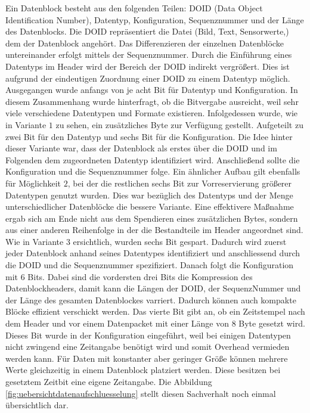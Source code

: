 Ein Datenblock besteht aus den folgenden Teilen: \gls{DOID} (Data Object
Identification Number), Datentyp, Konfiguration, Sequenznummer und der Länge des
Datenblocks. Die \gls{DOID} repräsentiert die Datei (Bild, Text, Sensorwerte,\etc)
dem der Datenblock angehört. Das Differenzieren der einzelnen Datenblöcke
untereinander erfolgt mittels der Sequenznummer. Durch die Einführung eines
Datentyps im Header wird der Bereich der \gls{DOID} indirekt vergrößert. Dies
ist aufgrund der eindeutigen Zuordnung einer \gls{DOID} zu einem Datentyp möglich.
\newline
Ausgegangen wurde anfangs von je acht Bit für Datentyp und Konfiguration.
In diesem Zusammenhang wurde hinterfragt, ob die Bitvergabe ausreicht,
weil sehr viele verschiedene Datentypen und Formate existieren. Infolgedessen
wurde, wie in Variante $1$ zu sehen, ein zusätzliches Byte zur Verfügung
gestellt. Aufgeteilt zu zwei Bit für den Datentyp und sechs Bit für die
Konfiguration. Die Idee hinter dieser Variante war, dass der Datenblock als
erstes über die \gls{DOID} und im Folgenden dem zugeordneten Datentyp identifiziert
wird. Anschließend sollte die Konfiguration und die Sequenznummer folge.
Ein ähnlicher Aufbau gilt ebenfalls für Möglichkeit $2$, bei der die restlichen
sechs Bit zur Vorreservierung größerer Datentypen genutzt wurden. Dies war
bezüglich des Datentyps und der Menge unterschiedlicher Datenblöcke die bessere
Variante. Eine effektivere Maßnahme ergab sich am Ende nicht aus dem
Spendieren eines zusätzlichen Bytes, sondern aus einer anderen Reihenfolge in
der die Bestandteile im Header angeordnet sind. Wie in Variante $3$ ersichtlich,
wurden sechs Bit gespart. Dadurch wird zuerst jeder Datenblock anhand
seines Datentypes identifiziert und anschliessend durch die \gls{DOID} und die
Sequenznummer spezifiziert. Danach folgt die Konfiguration mit $6$ Bits.
Dabei sind die vordersten drei Bits die Kompression des Datenblockheaders, damit
kann die Längen der \gls{DOID}, der SequenzNummer und der Länge des gesamten
Datenblockes varriert. Dadurch können auch kompakte Blöcke effizient verschickt
werden.
Das vierte Bit gibt an, ob ein Zeitstempel nach dem Header und vor einem
Datenpacket mit einer Länge von $8$ Byte gesetzt wird.
Dieses Bit wurde in der Konfiguration eingeführt, weil bei einigen Datentypen
nicht zwingend eine Zeitangabe benötigt wird und somit Overhead vermieden
werden kann. Für Daten mit konstanter aber geringer Größe können mehrere Werte
gleichzeitig in einem Datenblock platziert werden. Diese besitzen bei
gesetztem Zeitbit eine eigene Zeitangabe. Die Abbildung
\ref{fig:uebersichtdatenaufschluesselung} stellt diesen Sachverhalt noch einmal
übersichtlich dar.

